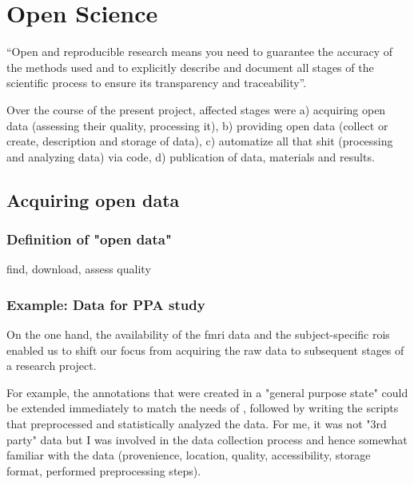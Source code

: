 \section{Open Science}

%
``Open and reproducible research means you need to guarantee the accuracy of the
methods used and to explicitly describe and document all stages of the
scientific process to ensure its transparency and traceability''.

%
Over the course of the present project, affected stages were
a) acquiring open data (assessing their quality, processing it),
%
b) providing open data (collect or create, description and storage of data),
%
c) automatize all that shit (processing and analyzing data) via code,
d) publication of data, materials and results.



\subsection{Acquiring open data}


\subsubsection{Definition of "open data"}


find, download, assess quality

\subsubsection{Example: Data for PPA study}

On the one hand, the availability of the \ac{fmri} data and the subject-specific
\acp{roi} enabled us to shift our focus from acquiring the raw data to
subsequent stages of a research project.

For example, the annotations \citep{haeusler2016cutanno} that were created in a
"general purpose state" could be extended immediately to match the needs of
\citep{haeusler2022processing}, followed by writing the scripts that
preprocessed and statistically analyzed the data.
%
For me, it was not "3rd party" data but I was involved in the data collection
process and hence somewhat familiar with the data (provenience, location,
quality, accessibility, storage format, performed preprocessing steps).

